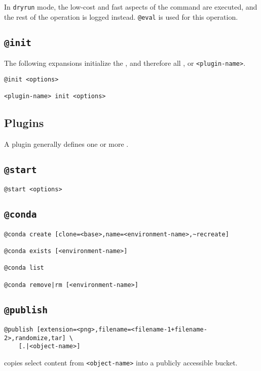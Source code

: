 In \texttt{dryrun} mode, the low-cost and fast aspects of the command are executed, and the rest of the operation is logged instead. \texttt{@eval} is used for this operation. 




\subsection{\texttt{@init}}\label{init}

The following expansions initialize the , and therefore all , or \texttt{<plugin-name>}.
%
\begin{verbatim}
@init <options>

<plugin-name> init <options>
\end{verbatim}

\subsection{Plugins}\label{plugins}

A plugin generally defines one or more .

\subsection{\texttt{@start}}\label{start}

\begin{verbatim}
@start <options>
\end{verbatim}

\subsection{\texttt{@conda}}\label{conda}

\begin{verbatim}
@conda create [clone=<base>,name=<environment-name>,~recreate]

@conda exists [<environment-name>]

@conda list

@conda remove|rm [<environment-name>]
\end{verbatim}

\subsection{\texttt{@publish}}\label{publish}

\begin{verbatim}
@publish [extension=<png>,filename=<filename-1+filename-2>,randomize,tar] \
    [.|<object-name>]
\end{verbatim}
%
copies select content from \texttt{<object-name>} into a publicly accessible bucket.


